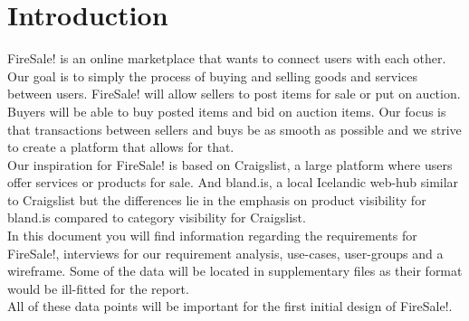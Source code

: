 \section{Introduction}
FireSale! is an online marketplace that wants to connect users with each other. Our goal is to simply the process of buying and selling goods and services between users. FireSale! will allow sellers to post items for sale or put on auction. Buyers will be able to buy posted items and bid on auction items. Our focus is that transactions between sellers and buys be as smooth as possible and we strive to create a platform that allows for that.\\


\noindent Our inspiration for FireSale! is based on Craigslist, a large platform where users offer services or products for sale. And bland.is, a local Icelandic web-hub similar to Craigslist but the differences lie in the emphasis on product visibility for bland.is compared to category visibility for Craigslist.\\

\noindent In this document you will find information regarding the requirements for FireSale!, interviews for our requirement analysis, use-cases, user-groups and a wireframe. Some of the data will be located in supplementary files as their format would be ill-fitted for the report.\\

\noindent All of these data points will be important for the first initial design of FireSale!.
